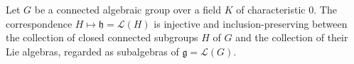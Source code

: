 Let $G$ be a connected algebraic group over a field $K$ of characteristic $0$. The correspondence $H \mapsto \mathfrak{h} = \mathcal{L}(H)$ is injective and inclusion-preserving between the collection of closed connected subgroups $H$ of $G$ and the collection of their Lie algebras, regarded as subalgebras of $\mathfrak{g} = \mathcal{L}(G)$.

